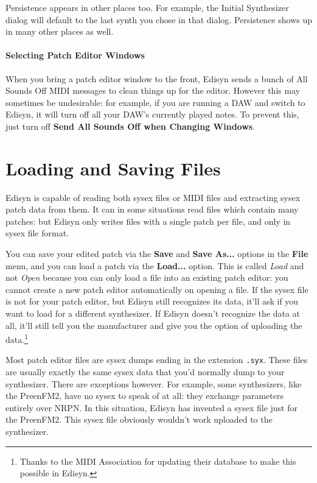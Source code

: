 \documentclass{article}
\begin{document}
Persistence appears in other places too.  For example, the Initial Synthesizer dialog will default to the last synth you chose in that dialog.  Persistence shows up in many other places as well.

\paragraph{Selecting Patch Editor Windows} When you bring a patch editor window to the front, Edisyn sends a bunch of All Sounds Off MIDI messages to clean things up for the editor.  However this may sometimes be undesirable: for example, if you are running a DAW and switch to Edisyn, it will turn off all your DAW's currently played notes.  To prevent this, just turn off {\bf Send All Sounds Off when Changing Windows}.


\section{Loading and Saving Files}

Edisyn is capable of reading both sysex files or MIDI files and extracting sysex patch data from them.  It can in some situations read files which contain many patches: but Edisyn only writes files with a single patch per file, and only in sysex file format.

You can save your edited patch via the {\bf Save} and {\bf Save As...} options in the {\bf File} menu, and you can load a patch via the {\bf Load...} option.  This is called {\it Load} and not {\it Open} because you can only load a file into an existing patch editor: you cannot create a new patch editor automatically on opening a file.  If the sysex file is not for your patch editor, but Edisyn still recognizes its data, it'll ask if you want to load for a different synthesizer.  If Edisyn doesn't recognize the data at all, it'll still tell you the manufacturer and give you the option of uploading the data.\footnote{Thanks to the MIDI Association for updating their database to make this possible in Edisyn.}

Most patch editor files are sysex dumps ending in the extension {\tt .syx}.  These files are usually exactly the same sysex data that you'd normally dump to your synthesizer. There are exceptions however.  For example, some synthesizers, like the PreenFM2, have no sysex to speak of at all: they exchange parameters entirely over NRPN.  In this situation, Edisyn has invented a sysex file just for the PreenFM2.  This sysex file obviously wouldn't work uploaded to the synthesizer.
\end{document}
